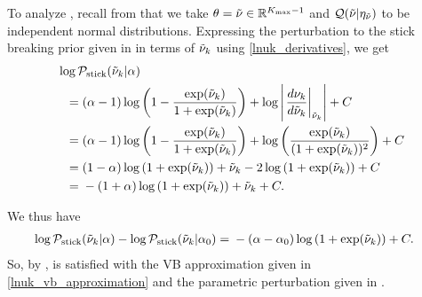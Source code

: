 \begin{ex}
%
To analyze , recall from  that we
take $\theta = \tilde{\nu} \in \mathbb{R}^{{K_{\mathrm{max}}} - 1}$ and $\mathcal{Q}(\tilde{\nu} \vert \eta_{\tilde{\nu}})$ to
be independent normal distributions.  Expressing the perturbation to the stick
breaking prior given in  in terms of $\tilde{\nu}_{k}$
using \eqref{lnuk_derivatives}, we get
%
\begin{align*}
%
\MoveEqLeft
\log \pstick(\lnuk \vert \alpha)
\\={}&
%
(\alpha - 1) \log\left(1 - \frac{\exp(\lnuk)}{1 + \exp(\lnuk)}\right) +
\log \abs{\fracat{d \nuk}{d \lnuk}{\lnuk}} +
\const
\\={}&
(\alpha - 1) \log\left(1 - \frac{\exp(\lnuk)}{1 + \exp(\lnuk)}\right) +
\log\left(\frac{\exp(\lnuk)}{(1 + \exp(\lnuk))^2}\right) +
    \const
\\={}&
(1 - \alpha) \log\left(1 + \exp(\lnuk)\right) +
\lnuk - 2 \log\left(1 + \exp(\lnuk)\right) + \const
\\={}&
-(1 + \alpha) \log\left(1 + \exp(\lnuk)\right) + \lnuk + \const.
%
\end{align*}

We thus have
%
\begin{align*}
%
\log \pstick(\lnuk \vert \alpha) - \log \pstick(\lnuk \vert \alpha_0)
={}&
    -(\alpha - \alpha_0) \log\left(1 + \exp(\lnuk)\right) + \const.
%
\end{align*}
%
So, by ,  is satisfied with
the VB approximation given in \eqref{lnuk_vb_approximation} and the parametric
perturbation given in .
%
\end{ex}


